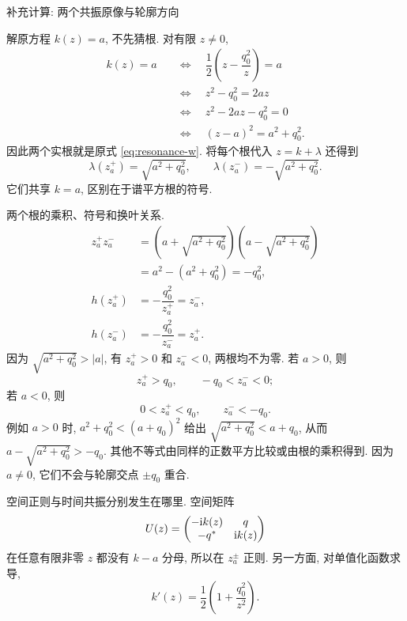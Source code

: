 \par\medskip\noindent 补充计算: 两个共振原像与轮廓方向\par
\par\smallskip\noindent 解原方程 $k(z)=a$, 不先猜根.\quad
对有限 $z\ne0$,
\begin{align*}
k(z)=a
&\quad\Longleftrightarrow\quad
\dfrac{1}{2}\left(z-\dfrac{q_0^2}{z}\right)=a\\
&\quad\Longleftrightarrow\quad
z^2-q_0^2=2az\\
&\quad\Longleftrightarrow\quad
z^2-2az-q_0^2=0\\
&\quad\Longleftrightarrow\quad
(z-a)^2=a^2+q_0^2.
\end{align*}
因此两个实根就是原式 \eqref{eq:resonance-w}. 将每个根代入 $z=k+\lambda$ 还得到
\begin{equation*}
\lambda(z_a^+)=\sqrt{a^2+q_0^2},
\qquad
\lambda(z_a^-)=-\sqrt{a^2+q_0^2}.
\end{equation*}
它们共享 $k=a$, 区别在于谱平方根的符号.
\par\smallskip\noindent 两个根的乘积、符号和换叶关系.\quad
\begin{align*}
z_a^+z_a^-
&=(a+\sqrt{a^2+q_0^2})(a-\sqrt{a^2+q_0^2})\\
&=a^2-(a^2+q_0^2)=-q_0^2,\\
h(z_a^+)&=-\dfrac{q_0^2}{z_a^+}=z_a^-,\\
h(z_a^-)&=-\dfrac{q_0^2}{z_a^-}=z_a^+.
\end{align*}
因为 $\sqrt{a^2+q_0^2}>|a|$, 有 $z_a^+>0$ 和 $z_a^-<0$, 两根均不为零. 若 $a>0$, 则
\begin{equation*}
z_a^+>q_0,
\qquad
-q_0<z_a^-<0;
\end{equation*}
若 $a<0$, 则
\begin{equation*}
0<z_a^+<q_0,
\qquad
z_a^-<-q_0.
\end{equation*}
例如 $a>0$ 时, $a^2+q_0^2<(a+q_0)^2$ 给出 $\sqrt{a^2+q_0^2}<a+q_0$, 从而 $a-\sqrt{a^2+q_0^2}>-q_0$. 其他不等式由同样的正数平方比较或由根的乘积得到. 因为 $a\ne0$, 它们不会与轮廓交点 $\pm q_0$ 重合.
\par\smallskip\noindent 空间正则与时间共振分别发生在哪里.\quad
空间矩阵
\begin{equation*}
U(z)=\begin{pmatrix}-\mathrm{i} k(z)&q\\-{q}^{*}&\mathrm{i} k(z)\end{pmatrix}
\end{equation*}
在任意有限非零 $z$ 都没有 $k-a$ 分母, 所以在 $z_a^\pm$ 正则. 另一方面, 对单值化函数求导,
\begin{equation*}
k'(z)=\dfrac{1}{2}\left(1+\dfrac{q_0^2}{z^2}\right).
\end{equation*}
